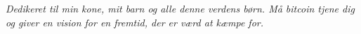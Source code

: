 
\newpage \vspace*{8cm}
\thispagestyle{empty}
\begin{center}
  \Large \emph{
    Dedikeret til min kone, mit barn og alle denne verdens børn. Må bitcoin 
    tjene dig og giver en vision for en fremtid, der er værd at kæmpe for.
  }
\end{center}
